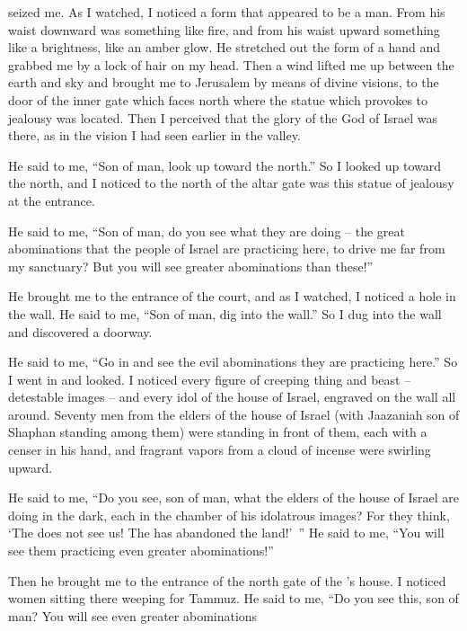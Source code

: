 {{}
seized me.
As I watched,
I noticed
a form
that appeared
to be a man. From his waist
downward
was
something
like fire,
and from his waist
upward
something
like a brightness,
like an amber
glow.
He stretched out
the form
of a hand
and grabbed
me by a lock
of hair on my head.
Then
a wind
lifted
me up between
the earth
and sky
and brought
me to
Jerusalem
by means of divine
visions,
to the door
of the inner
gate
which faces
north
where
the statue
which provokes
to
jealousy was located.
Then I
perceived
that the glory
of the God
of Israel
was there, as
in the vision
I had
seen
earlier in the valley.
\par }{\PP {}He said
to
me, “Son
of man,
look up
toward
the north.”
So I looked up
toward
the north,
and I noticed
to the north
of the altar
gate
was this
statue
of jealousy
at the entrance.
\par }{\PP {}He said
to me,
“Son
of man,
do you
see
what they
are doing
– the great
abominations
that
the people
of Israel
are practicing
here,
to drive me far
from my sanctuary? But you will
see
greater
abominations
than these!”
\par }{\PP {}He brought
me to
the entrance
of the court,
and as I watched, I noticed
a hole
in the wall.
He said
to me,
“Son
of man,
dig
into the wall.”
So I dug into
the wall
and discovered
a doorway.
\par }{\PP {}He said
to
me, “Go
in and see
the evil
abominations
they are practicing
here.”
So I went
in and looked.
I noticed
every
figure
of creeping thing
and beast
– detestable images – and every idol of the house of Israel, engraved on the wall all around.
Seventy
men
from the elders
of the house
of Israel
(with Jaazaniah
son
of Shaphan
standing
among
them) were standing
in front of
them, each
with a censer
in his hand,
and fragrant vapors
from a cloud
of incense
were swirling upward.
\par }{\PP {}He said
to
me, “Do you see,
son
of man,
what
the elders
of the house
of Israel
are doing
in the dark,
each
in the chamber
of his idolatrous images? For
they think,
‘The
{}
does not
see
us! The
{}
has abandoned
the
land!’ ”
He said
to me,
“You will
see
them practicing
even greater
abominations!”
\par }{\PP {}Then he brought
me to
the entrance
of the north
gate
of the
{}’s
house.
I noticed
women
sitting
there
weeping
for Tammuz.
He said
to me,
“Do you see
this, son
of man? You will
see
even greater
abominations
}
